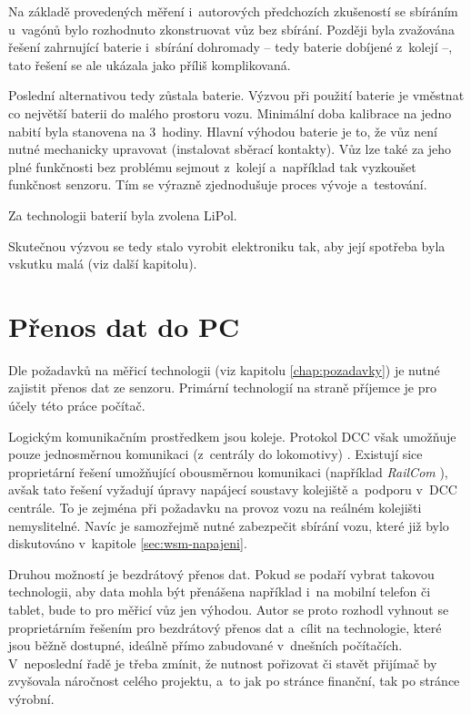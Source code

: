 Na základě provedených měření i~autorových předchozích zkušeností se sbíráním
u~vagónů bylo rozhodnuto zkonstruovat vůz bez sbírání. Později byla zvažována
řešení zahrnující baterie i~sbírání dohromady -- tedy baterie dobíjené z~kolejí
--, tato řešení se ale ukázala jako příliš komplikovaná.

Poslední alternativou tedy zůstala baterie. Výzvou při použití baterie je
vměstnat co největší baterii do malého prostoru vozu. Minimální doba kalibrace
na jedno nabití byla stanovena na 3~hodiny. Hlavní výhodou baterie je to, že
vůz není nutné mechanicky upravovat (instalovat sběrací kontakty). Vůz lze také
za jeho plné funkčnosti bez problému sejmout z~kolejí a~například tak vyzkoušet
funkčnost senzoru. Tím se výrazně zjednodušuje proces vývoje a~testování.

Za technologii baterií byla zvolena LiPol.

Skutečnou výzvou se tedy stalo vyrobit elektroniku tak, aby její spotřeba byla
vskutku malá (viz další kapitolu).

\section{Přenos dat do PC}
\label{sec:wsm-prenos-pc}

Dle požadavků na měřicí technologii (viz kapitolu \ref{chap:pozadavky}) je
nutné zajistit přenos dat ze senzoru. Primární technologií na straně
příjemce je pro účely této práce počítač.

Logickým komunikačním prostředkem jsou koleje. Protokol \gls{DCC}
\cite{nmra:dcc:proto} však umožňuje pouze jednosměrnou komunikaci (z~centrály
do lokomotivy) \cite{nmra:dcc:proto}. Existují sice proprietární řešení
umožňující obousměrnou komunikaci (například \textit{RailCom} \cite{railcom}),
avšak tato řešení vyžadují úpravy napájecí soustavy kolejiště a~podporu
v~\gls{DCC} centrále. To je zejména při požadavku na provoz vozu na reálném
kolejišti nemyslitelné. Navíc je samozřejmě nutné zabezpečit sbírání vozu,
které již bylo diskutováno v~kapitole \ref{sec:wsm-napajeni}.

Druhou možností je bezdrátový přenos dat. Pokud se podaří vybrat takovou
technologii, aby data mohla být přenášena například i~na mobilní telefon či
tablet, bude to pro měřicí vůz jen výhodou. Autor se proto rozhodl vyhnout se
proprietárním řešením pro bezdrátový přenos dat a~cílit na technologie, které
jsou běžně dostupné, ideálně přímo zabudované v~dnešních počítačích.
V~neposlední řadě je třeba zmínit, že nutnost pořizovat či stavět přijímač by
zvyšovala náročnost celého projektu, a~to jak po stránce finanční, tak po
stránce výrobní.

